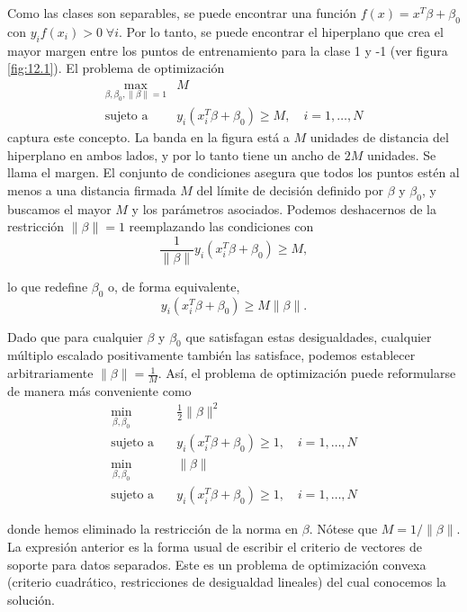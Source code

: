 Como las clases son separables, se puede encontrar una función $f(x) = x^T\beta + \beta_0$ con $y_i f(x_i) > 0 \; \forall i$. Por lo tanto, se puede encontrar el hiperplano que crea el mayor margen entre los puntos de entrenamiento para la clase 1 y -1 (ver figura \ref{fig:12.1}). El problema de optimización 
\begin{align}
\max_{\beta, \beta_0, \|\beta\|=1} & M \\
\text{sujeto a} \quad & y_i (x_i^T \beta + \beta_0) \geq M, \quad i = 1, \ldots, N
\end{align}
captura este concepto. La banda en la figura está a $M$ unidades de distancia del hiperplano en ambos lados, y por lo tanto tiene un ancho de $2M$ unidades. Se llama el margen. El conjunto de condiciones asegura que todos los puntos estén al menos a una distancia firmada $M$ del límite de decisión definido por $\beta$ y $\beta_0$, y buscamos el mayor $M$ y los parámetros asociados. Podemos deshacernos de la restricción $\|\beta\| = 1$ reemplazando las condiciones con
\begin{equation}
\frac{1}{\|\beta\|} y_i (x_i^T \beta + \beta_0) \geq M,
\end{equation}

\noindent lo que redefine $\beta_0$ o, de forma equivalente,
\begin{equation}
y_i (x_i^T \beta + \beta_0) \geq M \|\beta\|.
\end{equation}

Dado que para cualquier $\beta$ y $\beta_0$ que satisfagan estas desigualdades, cualquier múltiplo escalado positivamente también las satisface, podemos establecer arbitrariamente $\|\beta\| = \frac{1}{M}$. Así, el problema de optimización puede reformularse de manera más conveniente como
\begin{align}
\min_{\beta, \beta_0} & \frac{1}{2} \|\beta\|^2 \\
\text{sujeto a} \quad & y_i (x_i^T \beta + \beta_0) \geq 1, \quad i = 1, \ldots, N
\end{align}
\begin{align}
\min_{\beta, \beta_0} & \|\beta\| \\
\text{sujeto a} \quad & y_i (x_i^T \beta + \beta_0) \geq 1, \quad i = 1, \ldots, N
\end{align}

donde hemos eliminado la restricción de la norma en $\beta$. Nótese que $M = 1/\|\beta\|$. La expresión anterior es la forma usual de escribir el criterio de vectores de soporte para datos separados. Este es un problema de optimización convexa (criterio cuadrático, restricciones de desigualdad lineales) del cual conocemos la solución. \\

